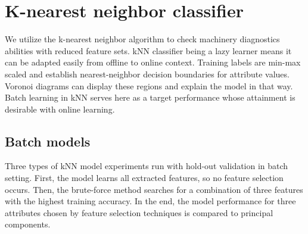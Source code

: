 \section{K-nearest neighbor classifier}
We utilize the k-nearest neighbor algorithm to check machinery diagnostics abilities with reduced feature sets. kNN classifier being a lazy learner means it can be adapted easily from offline to online context. Training labels are min-max scaled and establish nearest-neighbor decision boundaries for attribute values. Voronoi diagrams can display these regions and explain the model in that way. Batch learning in kNN serves here as a target performance whose attainment is desirable with online learning.

\subsection{Batch models}
Three types of kNN model experiments run with hold-out validation in batch setting. 
First, the model learns all extracted features, so no feature selection occurs. Then, the brute-force method searches for a combination of three features with the highest training accuracy. In the end, the model performance for three attributes chosen by feature selection techniques is compared to principal components.

